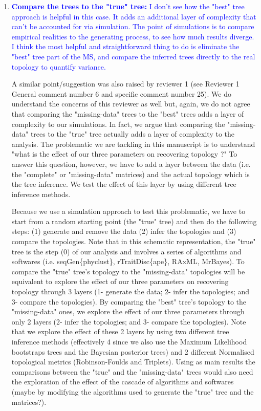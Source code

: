 \documentclass[12pt,letterpaper]{article}
\begin{document}
\begin{enumerate}
\item{\textcolor{blue}{\textbf{Compare the trees to the "true" tree:} I don't see how the "best" tree approach is helpful in this case. It adds an additional layer of complexity that can't be accounted for via simulation. The point of simulations is to compare empirical realities to the generating process, to see how much results diverge. I think the most helpful and straightforward thing to do is eliminate the "best" tree part of the MS, and compare the inferred trees directly to the real topology to quantify variance.}}

A similar point/suggestion was also raised by reviewer 1 (see Reviewer 1 General comment number 6 and specific comment number 25).
We do understand the concerns of this reviewer as well but, again, we do not agree that comparing the "missing-data" trees to the "best" trees adds a layer of complexity to our simulations.
In fact, we argue that comparing the "missing-data" trees to the "true" tree actually adds a layer of complexity to the analysis.
The problematic we are tackling in this manuscript is to understand "what is the effect of our three parameters on recovering topology ?"
To answer this question, however, we have to add a layer between the data (i.e. the "complete" or "missing-data" matrices) and the actual topology which is the tree inference.
We test the effect of this layer by using different tree inference methods.

Because we use a simulation approach to test this problematic, we have to start from a random starting point (the "true" tree) and then do the following steps: (1) generate and remove the data (2) infer the topologies and (3) compare the topologies.
Note that in this schematic representation, the "true" tree is the step (0) of our analysis and involves a series of algorithms and softwares (i.e. seqGen\{phyclust\}, rTraitDisc\{ape\}, RAxML, MrBayes).
To compare the "true" tree's topology to the "missing-data" topologies will be equivalent to explore the effect of our three parameters on recovering topology through 3 layers (1- generate the data; 2- infer the topologies; and 3- compare the topologies).
By comparing the "best" tree's topology to the "missing-data" ones, we explore the effect of our three parameters through only 2 layers (2- infer the topologies; and 3- compare the topologies).
Note that we explore the effect of these 2 layers by using two different tree inference methods (effectively 4 since we also use the Maximum Likelihood bootstraps trees and the Bayesian posterior trees) and 2 different Normalised topological metrics (Robinson-Foulds and Triplets).
Using as main results the comparisons between the "true" and the "missing-data" trees would also need the exploration of the effect of the cascade of algorithms and softwares (maybe by modifying the algorithms used to generate the "true" tree and the matrices?).


\end{enumerate}
\end{document}
